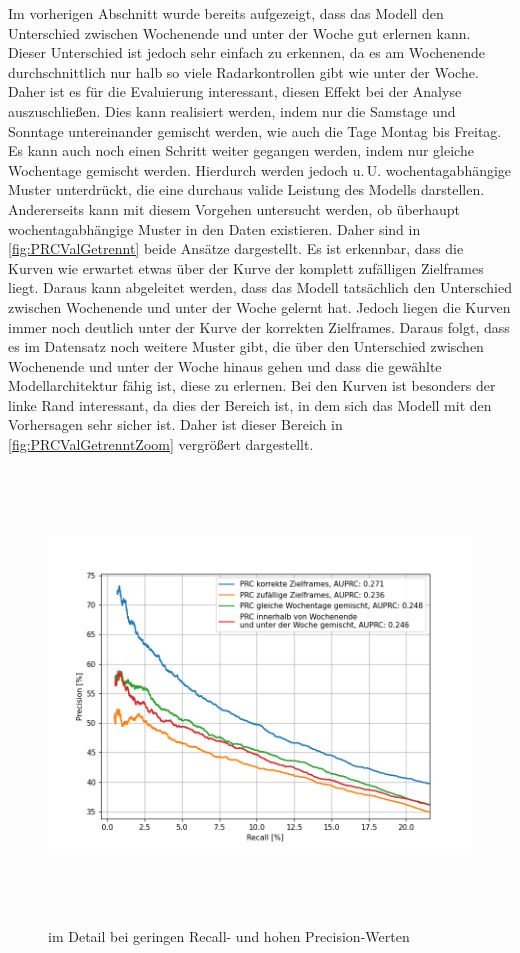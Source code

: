 Im vorherigen Abschnitt wurde bereits aufgezeigt, dass das Modell den Unterschied zwischen Wochenende und unter der Woche gut erlernen kann.
Dieser Unterschied ist jedoch sehr einfach zu erkennen, da es am Wochenende durchschnittlich nur halb so viele Radarkontrollen gibt wie unter der Woche.
Daher ist es für die Evaluierung interessant, diesen Effekt bei der Analyse auszuschließen.
Dies kann realisiert werden, indem nur die Samstage und Sonntage untereinander gemischt werden, wie auch die Tage Montag bis Freitag.
Es kann auch noch einen Schritt weiter gegangen werden, indem nur gleiche Wochentage gemischt werden.
Hierdurch werden jedoch u.\,U. wochentagabhängige Muster unterdrückt, die eine durchaus valide Leistung des Modells darstellen.
Andererseits kann mit diesem Vorgehen untersucht werden, ob überhaupt wochentagabhängige Muster in den Daten existieren.
Daher sind in \autoref{fig:PRCValGetrennt} beide Ansätze dargestellt.
Es ist erkennbar, dass die Kurven wie erwartet etwas über der Kurve der komplett zufälligen Zielframes liegt.
Daraus kann abgeleitet werden, dass das Modell tatsächlich den Unterschied zwischen Wochenende und unter der Woche gelernt hat.
Jedoch liegen die Kurven immer noch deutlich unter der Kurve der korrekten Zielframes.
Daraus folgt, dass es im Datensatz noch weitere Muster gibt, die über den Unterschied zwischen Wochenende und unter der Woche hinaus gehen und dass die gewählte Modellarchitektur fähig ist, diese zu erlernen.
Bei den Kurven ist besonders der linke Rand interessant, da dies der Bereich ist, in dem sich das Modell mit den Vorhersagen sehr sicher ist.
Daher ist dieser Bereich in \autoref{fig:PRCValGetrenntZoom} vergrößert dargestellt.

\begin{figure}[h]
    \centering
    \includegraphics[width=1.0\textwidth,height=12cm,keepaspectratio=true]{content/images/PRCValGetrenntZoom.png}
    \caption{ im Detail bei geringen Recall- und hohen Precision-Werten}
    \label{fig:PRCValGetrenntZoom}
\end{figure}

